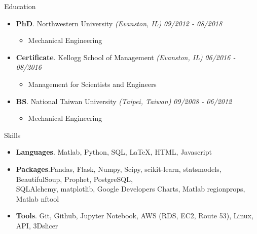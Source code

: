 \documentclass{resume} %
\begin{document}
	
	
	\begin{rSection}{Education}
		\begin{itemize}[leftmargin=0em]
			\item {\bf PhD}{. Northwestern University} \textit{(Evanston, IL)} \hfill {\em 09/2012 - 08/2018} 
			\vspace{-3mm}
			\begin{itemize}
				\setlength\itemsep{-3em}
				\item Mechanical Engineering
			\end{itemize}
			\item {\bf Certificate}{. Kellogg School of Management} \textit{(Evanston, IL)} \hfill {\em 06/2016 - 08/2016} 
			\vspace{-3mm}
			\begin{itemize}
				\setlength\itemsep{-3em}
				\item Management for Scientists and Engineers
			\end{itemize}
			\item {\bf BS}{. National Taiwan University} \textit{(Taipei, Taiwan)} \hfill {\em 09/2008 - 06/2012} 
			\vspace{-3mm}
			\begin{itemize}
				\setlength\itemsep{-3em}
				\item Mechanical Engineering
			\end{itemize}
		\end{itemize}
		
		
		
		
		
	\end{rSection}
	
	\begin{rSection}{Skills}
		\begin{itemize}[leftmargin=0em]
			\item {\bf Languages}{. Matlab, Python, SQL, LaTeX, HTML, Javascript}
			\item {\bf Packages}{.Pandas, Flask, Numpy, Scipy, scikit-learn, statsmodels, BeautifulSoup, Prophet, PostgreSQL, \\SQLAlchemy, matplotlib, Google Developers Charts, Matlab regionprops, Matlab nftool}
			\item {\bf Tools}{. Git, Github, Jupyter Notebook, AWS (RDS, EC2, Route 53), Linux, API, 3Dslicer}
			
		\end{itemize}
	\end{rSection}
	
	
	
	
	
\end{document}
